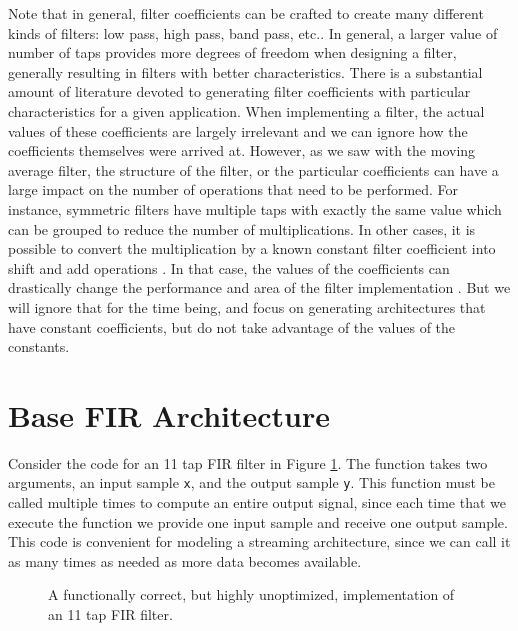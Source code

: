 Note that in general, filter coefficients can be crafted to create many different kinds of filters: low pass, high pass, band pass, etc.. In general, a larger value of number of taps provides more degrees of freedom when designing a filter, generally resulting in filters with better characteristics. There is a substantial amount of literature devoted to generating filter coefficients with particular characteristics for a given application. When implementing a filter, the actual values of these coefficients are largely irrelevant and we can ignore how the coefficients themselves were arrived at.  However, as we saw with the moving average filter, the structure of the filter, or the particular coefficients can have a large impact on the number of operations that need to be performed.  For instance, symmetric filters have multiple taps with exactly the same value which can be grouped to reduce the number of multiplications.  In other cases, it is possible to convert the multiplication by a known constant filter coefficient into shift and add operations \cite{kastner2010arithmetic}. In that case, the values of the coefficients can drastically change the performance and area of the filter implementation \cite{mirzaei2007fpga}. But we will ignore that for the time being, and focus on generating architectures that have constant coefficients, but do not take advantage of the values of the constants.

\section{Base FIR Architecture}
\label{sec:base_fir}

Consider the code for an 11 tap FIR filter in Figure \ref{fig:fir11_initial}. The function takes two arguments, an input sample \lstinline{x}, and the output sample \lstinline{y}. This function must be called multiple times to compute an entire output signal, since each time that we execute the function we provide one input sample and receive one output sample. This code is convenient for modeling a streaming architecture, since we can call it as many times as needed as more data becomes available.

\begin{figure}

\caption{A functionally correct, but highly unoptimized, implementation of an 11 tap FIR filter. }
\label{fig:fir11_initial}
\end{figure}


